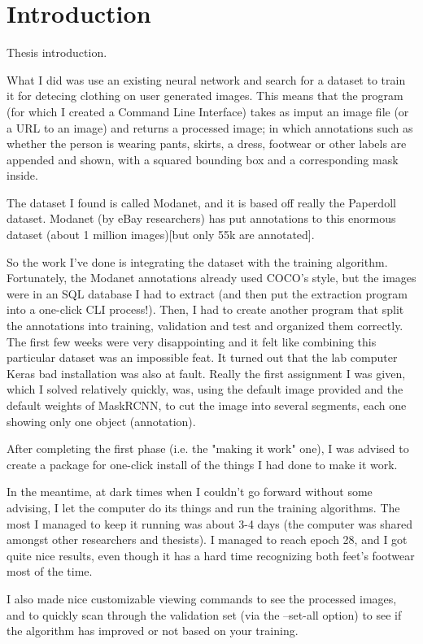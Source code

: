 \chapter*{Introduction}

Thesis introduction.

What I did was use an existing neural network and search for a dataset to train it for detecing clothing on user generated images. This means that the program (for which I created a Command Line Interface) takes as imput an image file (or a URL to an image) and returns a processed image; in which annotations such as whether the person is wearing pants, skirts, a dress, footwear or other labels are appended and shown, with a squared bounding box and a corresponding mask inside.

The dataset I found is called Modanet, and it is based off really the Paperdoll dataset. Modanet (by eBay researchers) has put annotations to this enormous dataset (about 1 million images)[but only  55k are annotated].

So the work I've done is integrating the dataset with the training algorithm. Fortunately, the Modanet annotations already used COCO's style, but the images were in an SQL database I had to extract (and then put the extraction program into a one-click CLI process!).
Then, I had to create another program that split the annotations into training, validation and test and organized them correctly. The first few weeks were very disappointing and it felt like combining this particular dataset was an impossible feat. It turned out that the lab computer Keras bad installation was also at fault.
Really the first assignment I was given, which I solved relatively quickly, was, using the default image provided and the default weights of MaskRCNN, to cut the image into several segments, each one showing only one object (annotation).

After completing the first phase (i.e. the "making it work" one), I was advised to create a package for one-click install of the things I had done to make it work.

In the meantime, at dark times when I couldn't go forward without some advising, I let the computer do its things and run the training algorithms. The most I managed to keep it running was about 3-4 days (the computer was shared amongst other researchers and thesists). I managed to reach epoch 28, and I got quite nice results, even though it has a hard time recognizing both feet's footwear most of the time. 

I also made nice customizable viewing commands to see the processed images, and to quickly scan through the validation set (via the --set-all option) to see if the algorithm has improved or not based on your training.